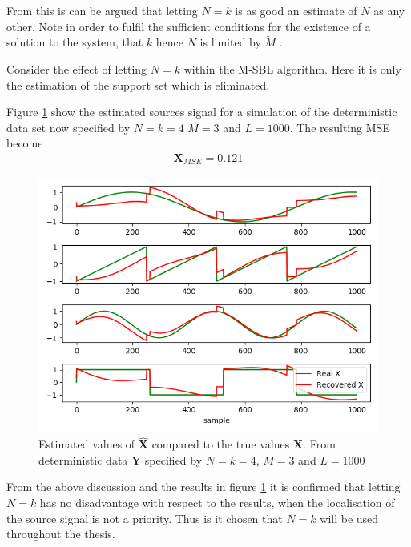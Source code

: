 From this is can be argued that letting $N = k$ is as good an estimate of $N$ as any other. Note in order to fulfil the sufficient conditions for the existence of a solution to the system, that $k$ hence $N$ is limited by $\widetilde{M}$ .     

Consider the effect of letting $N = k$ within the M-SBL algorithm. Here it is only the estimation of the support set which is eliminated.   

Figure \ref{fig:M-SBL_simple3} show the estimated sources signal for a simulation of the deterministic data set now specified by $N=k=4$ $M = 3$ and $L=1000$. The resulting MSE become
\begin{align*}
\textbf{X}_{MSE} = 0.121
\end{align*}

\begin{figure}[H]
\centering
\includegraphics[scale=0.5]{figures/ch_6/M-SBL_simple3.png}
\caption{Estimated values of $\hat{\textbf{X}}$ compared to the true 				values $\textbf{X}$. From deterministic data $\textbf{Y}$ specified by $N=k=4$, $M = 3$ and $L=1000$ }
\label{fig:M-SBL_simple3}
\end{figure}

From the above discussion and the results in figure \ref{fig:M-SBL_simple3} it is confirmed that letting $N=k$ has no disadvantage with respect to the results, when the localisation of the source signal is not a priority. Thus is it chosen that $N=k$ will be used throughout the thesis. 

